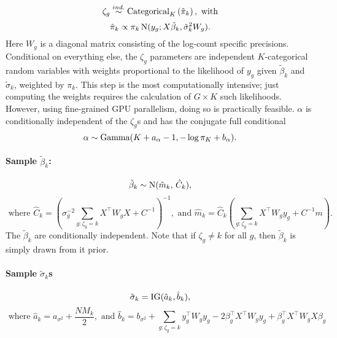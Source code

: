 \begin{equation*}
\zeta_g \stackrel{ind.}{\sim} \operatorname{Categorical}_K\left(\hat{\pi}_k \right), \mbox{ with}
\end{equation*}
\begin{equation*}
\hat{\pi}_k \propto \pi_k \operatorname{N}(y_g;X\tilde{\beta}_k,\tilde{\sigma}_k^2 W_g).
\end{equation*}
Here $W_g$ is a diagonal matrix consisting of the log-count specific precisions. Conditional on everything else, the $\zeta_g$ parameters are independent $K$-categorical random variables with weights proportional to the likelihood of $y_g$ given $\tilde{\beta}_k$ and $\tilde{\sigma}_k$, weighted by $\pi_k$. This step is the most computationally intensive; just computing the weights requires the calculation of $G\times K$ such likelihoods. However, using fine-grained GPU parallelism, doing so is practically feasible. $\alpha$ is conditionally independent of the $\zeta_g$s and has the conjugate full conditional
\begin{equation*}
\alpha \sim \operatorname{Gamma}(K + a_\alpha - 1, -\log \pi_K + b_\alpha).
\end{equation*}


\paragraph{Sample $\tilde{\beta}_k$:}
\begin{equation*}
\tilde{\beta}_k \sim \operatorname{N}(\hat{m}_k,\, \hat{C}_k),
\end{equation*}
\begin{equation*}
\mbox{ where }\hat{C}_k= \left( \sigma^{-2}_g\sum_{g:\zeta_g=k}
  X^\top W_g X + C^{-1} \right)^{-1}, \mbox{ and }\hat{m}_k=\hat{C}_k \left(\sum_{g:\zeta_g=k} X^\top W_g y_g +
      C^{-1}m \right).
\end{equation*}
The $\tilde{\beta}_k$ are conditionally independent. Note that if $\zeta_g \neq k$ for all $g$, then $\tilde{\beta}_k$ is simply drawn from it prior.

\paragraph{Sample $\tilde{\sigma}_k$s}
\begin{equation*}
      \tilde{\sigma}_k = \operatorname{IG}(\hat{a}_k,\hat{b}_k),
    \end{equation*}
    \begin{equation*}
      \mbox{ where }\hat{a}_k = a_{\sigma^2} + \frac{NM_k}{2},\mbox{ and }\hat{b}_k= b_{\sigma^2} + \sum_{g:\zeta_g=k}y_g^\top W_g y_g -2 \beta_g^\top X^\top W_g y_g  +\beta_g^\top X^\top W_g X \beta_g
    \end{equation*}

